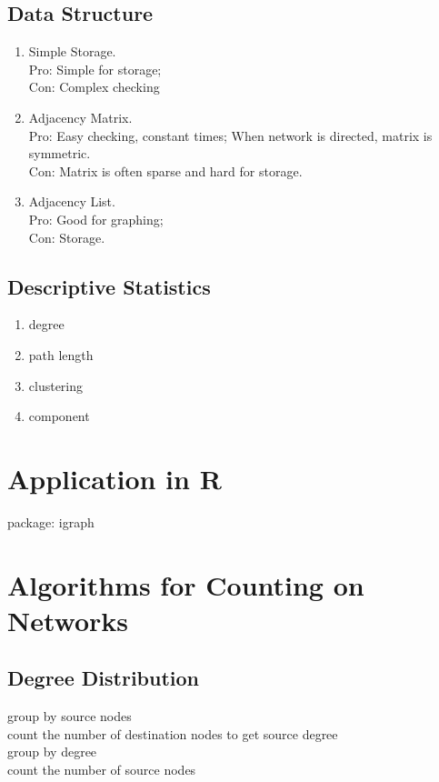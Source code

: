 \subsection{Data Structure}
\begin{enumerate}
  \item Simple Storage. \\
  Pro: Simple for storage; \\
  Con: Complex checking
  \item Adjacency Matrix. \\
  Pro: Easy checking, constant times; When network is directed, matrix is symmetric. \\
  Con: Matrix is often sparse and hard for storage.
  \item Adjacency List. \\
  Pro: Good for graphing; \\
  Con: Storage.
\end{enumerate}

\subsection{Descriptive Statistics}
\begin{enumerate}
  \item degree
  \item path length
  \item clustering
  \item component
\end{enumerate}

\section{Application in R}
package: igraph

\section{Algorithms for Counting on Networks}
\subsection{Degree Distribution}
group by source nodes\\
count the number of destination nodes to get source degree\\
group by degree\\
count the number of source nodes\\

